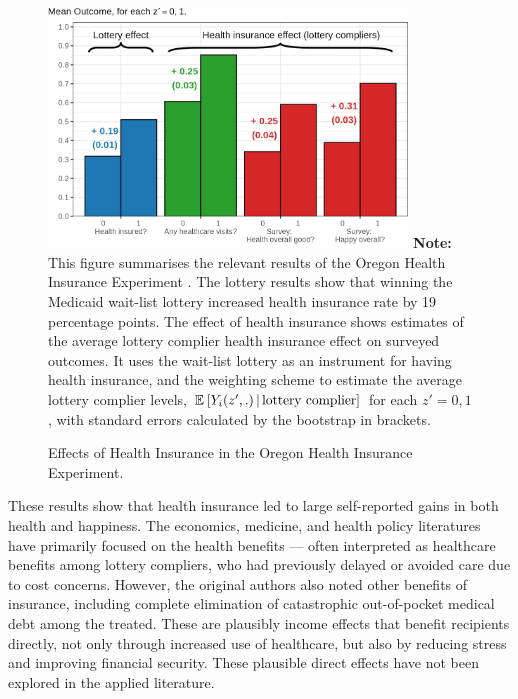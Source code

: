 \begin{figure}[!h]
    \caption{Effects of Health Insurance in the Oregon Health Insurance Experiment.}
    \centering
    \includegraphics[width=0.85\textwidth]{sections/figures/insurance-effects.png}
    \label{fig:healthinsurance-effects}
    \justify
    \footnotesize    
    \textbf{Note:}
    This figure summarises the relevant results of the Oregon Health Insurance Experiment \citep{finkelstein2008oregon}.
    The lottery results show that winning the Medicaid wait-list lottery increased health insurance rate by 19 percentage points.
    The effect of health insurance shows estimates of the average lottery complier health insurance effect on surveyed outcomes.
    It uses the wait-list lottery as an instrument for having health insurance, and the \cite{abadie2003semiparametric} weighting scheme to estimate the average lottery complier levels, $\mathbb{E}_{} \left[ Y_i(z',.) \, \middle\vert \, \text{lottery complier} \right]$ for each $z'=0,1$, with standard errors calculated by the bootstrap in brackets.
\end{figure}

These results show that health insurance led to large self-reported gains in both health and happiness.
The economics, medicine, and health policy literatures have primarily focused on the health benefits --- often interpreted as healthcare benefits among lottery compliers, who had previously delayed or avoided care due to cost concerns.
However, the original authors also noted other benefits of insurance, including complete elimination of catastrophic out-of-pocket medical debt among the treated.
These are plausibly income effects that benefit recipients directly, not only through increased use of healthcare, but also by reducing stress and improving financial security.
These plausible direct effects have not been explored in the applied literature.

